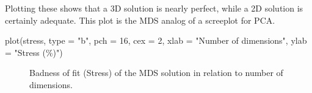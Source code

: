 \documentclass[
  letterpaper,
  10pt,
  krantz2]{krantz}
\makeatletter
\newenvironment{Shaded}{\begin{snugshade}}{\end{snugshade}}
\newcommand{\AttributeTok}[1]{\textcolor[rgb]{0.40,0.45,0.13}{#1}}
\newcommand{\CommentTok}[1]{\textcolor[rgb]{0.37,0.37,0.37}{#1}}
\newcommand{\ConstantTok}[1]{\textcolor[rgb]{0.56,0.35,0.01}{#1}}
\newcommand{\ControlFlowTok}[1]{\textcolor[rgb]{0.00,0.23,0.31}{#1}}
\newcommand{\DecValTok}[1]{\textcolor[rgb]{0.68,0.00,0.00}{#1}}
\newcommand{\FunctionTok}[1]{\textcolor[rgb]{0.28,0.35,0.67}{#1}}
\newcommand{\NormalTok}[1]{\textcolor[rgb]{0.00,0.23,0.31}{#1}}
\newcommand{\OtherTok}[1]{\textcolor[rgb]{0.00,0.23,0.31}{#1}}
\newcommand{\SpecialCharTok}[1]{\textcolor[rgb]{0.37,0.37,0.37}{#1}}
\newcommand{\StringTok}[1]{\textcolor[rgb]{0.13,0.47,0.30}{#1}}
\newenvironment{kframe}{%
  \medskip{}
  \setlength{\fboxsep}{.8em}
  \def\at@end@of@kframe{}%
  \ifinner\ifhmode%
  \def\at@end@of@kframe{\end{minipage}}%
  \begin{minipage}{\columnwidth}%
  \fi\fi%
  \def\FrameCommand##1{\hskip\@totalleftmargin \hskip-\fboxsep
  \colorbox{shadecolor}{##1}\hskip-\fboxsep
      \hskip-\linewidth \hskip-\@totalleftmargin \hskip\columnwidth}%
  \MakeFramed {\advance\hsize-\width
    \@totalleftmargin\z@ \linewidth\hsize
    \@setminipage}}%
{\par\unskip\endMakeFramed%
  \at@end@of@kframe}
\renewenvironment{Shaded}{\begin{kframe}}{\end{kframe}}
\makeatother
\begin{document}
\begin{Shaded}
\end{Shaded}

Plotting these shows that a 3D solution is nearly perfect, while a 2D
solution is certainly adequate. This plot is the MDS analog of a
screeplot for PCA.

\begin{Shaded}
\begin{Highlighting}[]
\FunctionTok{plot}\NormalTok{(stress, }\AttributeTok{type =} \StringTok{"b"}\NormalTok{, }\AttributeTok{pch =} \DecValTok{16}\NormalTok{, }\AttributeTok{cex =} \DecValTok{2}\NormalTok{,}
     \AttributeTok{xlab =} \StringTok{"Number of dimensions"}\NormalTok{,}
     \AttributeTok{ylab =} \StringTok{"Stress (\%)"}\NormalTok{)}
\end{Highlighting}
\end{Shaded}

\begin{figure}


\caption{\label{fig-diabetes-stress}Badness of fit (Stress) of the MDS
solution in relation to number of dimensions.}

\end{figure}%
\end{document}
